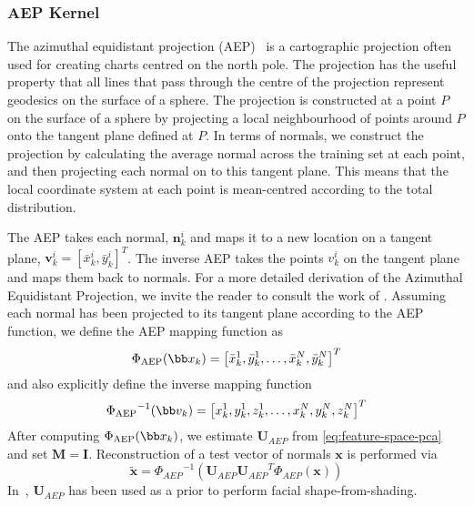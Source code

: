 \subsubsection{AEP Kernel}\label{subsubsec:sing_img_aep_kernel}
The azimuthal equidistant projection (AEP)~\cite{snyder1987map,smith2006recovering} is a
cartographic projection often used for creating charts centred on the north
pole. The projection has the useful property that all lines that pass through
the centre of the projection represent geodesics on the surface of a sphere. The
projection is constructed at a point $P$ on the surface of a sphere by
projecting a local neighbourhood of points around $P$ onto the tangent plane
defined at $P$. In terms of normals, we construct the projection by calculating
the average normal across the training set at each point, and then projecting
each normal on to this tangent plane. This means that the local coordinate
system at each point is mean-centred according to the total distribution.

The AEP takes each normal, $\mathbf{n}_k^i$ and maps it to a new location on
a tangent plane, $\mathbf{v}_k^i = [\bar{x}_k^i, \bar{y}_k^i]^T$. The
inverse AEP takes the points  $v_k^i$ on the tangent plane and maps them back to
normals. For a more detailed derivation of the Azimuthal Equidistant Projection,
we invite the reader to consult the work of \citet{smith2006recovering}. Assuming each
normal has been projected to its tangent plane according to the AEP function, we
define the AEP mapping function as
\begin{equation}\label{eq:aep-kernel}
    \aep = \left[ \bar{x}_k^1, \bar{y}_k^1, \ldots, \bar{x}_k^N, \bar{y}_k^N \right]^T
\end{equation}
and also explicitly define the inverse mapping function
\begin{equation}\label{eq:inv-aep-kernel}
    \invaep = \left[ x_k^1, y_k^1, z_k^1, \dots, x_k^N, y_k^N, z_k^N \right]^T
\end{equation}
After computing $\aep$, we estimate $\mathbf{U}_{AEP}$ from 
\cref{eq:feature-space-pca} and set $\mathbf{M} = \mathbf{I}$. Reconstruction 
of a test vector of normals $\mathbf{x}$ is performed via
\begin{equation}\label{eq:aep-reconstruction}
   \tilde{\mathbf{x}} = {\Phi_{AEP}}^{-1} \left( \mathbf{U}_{AEP} {\mathbf{U}_{AEP}}^T \Phi_{AEP}(\mathbf{x}) \right)
\end{equation}
In~\cite{smith2006recovering}, $\mathbf{U}_{AEP}$ has been used as a prior to
perform facial shape-from-shading.

